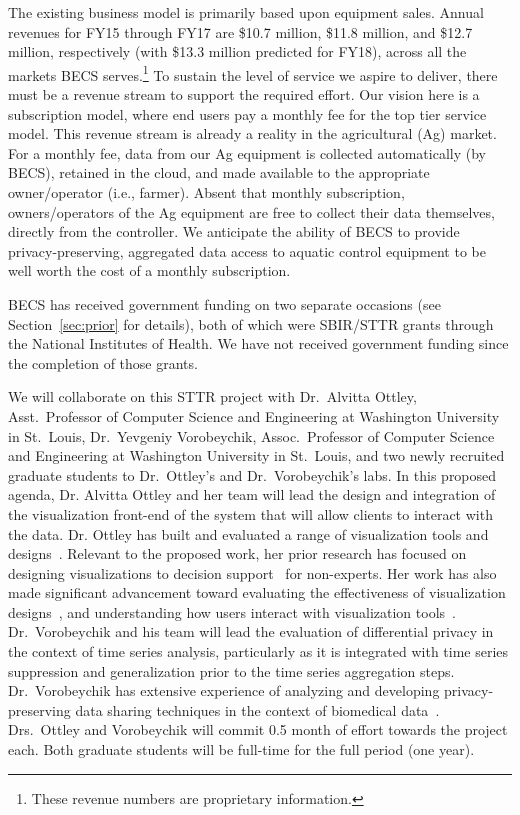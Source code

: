 The existing business model is primarily based upon equipment sales.
Annual revenues for FY15 through FY17 are \$10.7 million, \$11.8 million,
and \$12.7 million, respectively
(with \$13.3 million predicted for FY18), across all the markets BECS
serves.\footnote{These revenue numbers are proprietary information.}
To sustain the level of service we aspire to deliver, there must be
a revenue stream to support the required effort.  Our vision here is
a subscription model, where end users pay a monthly fee for the
top tier service model.
This revenue stream is already a reality in the agricultural (Ag) market.
For a monthly fee, data from our Ag equipment is collected automatically
(by BECS), retained in the cloud, and made available to the appropriate
owner/operator (i.e., farmer).  Absent that monthly subscription,
owners/operators of the Ag equipment are free to collect their data
themselves, directly from the controller.
We anticipate the ability of BECS to provide privacy-preserving,
aggregated data access to aquatic control equipment to be well worth
the cost of a monthly subscription.

BECS has received government funding on two separate occasions
(see Section~\ref{sec:prior} for details), both of which were SBIR/STTR
grants through the National Institutes of Health.  We have not received
government funding since the completion of those grants.

We will collaborate on this STTR project with Dr.~Alvitta Ottley,
Asst.~Professor of Computer Science and Engineering at Washington University
in St.~Louis, Dr.~Yevgeniy Vorobeychik, Assoc.~Professor of Computer Science and Engineering at Washington University
in St.~Louis, and two newly recruited graduate students to
Dr.~Ottley's and Dr.~Vorobeychik's labs.
In this proposed agenda, Dr. Alvitta Ottley and her team will lead the design and integration of the visualization front-end of the system that will allow clients to interact with the data.
Dr. Ottley has built and evaluated a range of visualization tools and designs~\cite{brown2014finding, hakone2017proact,ottley2015personality,peck2013using}. 
Relevant to the proposed work, her prior research has focused on designing visualizations to decision support~\cite{hakone2017proact,ottley2012visually,ottley2016improving} for non-experts. 
Her work has also made significant advancement toward evaluating the
effectiveness of visualization
designs~\cite{peck2013using,ziemkiewicz2013visualization}, and
understanding how users interact with visualization
tools~\cite{brown2014finding,ottley2015personality}.  
Dr.~Vorobeychik and his team will lead the evaluation of differential
privacy in the context of time series analysis, particularly as it is
integrated with time series suppression and generalization prior to
the time series aggregation steps.
Dr.~Vorobeychik has extensive experience of analyzing and developing
privacy-preserving data sharing techniques in the context of
biomedical data~\cite{Wan17b,Wan15,Wan17a,Xia15}.
Drs.~Ottley and Vorobeychik will commit 0.5 month of effort towards
the project each.
Both graduate students will be full-time for the full period (one year).

